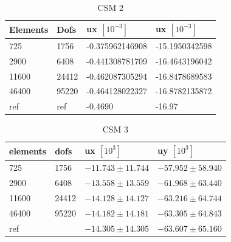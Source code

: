 \begin{table}[h!]
\centering
\caption{CSM 2}
\label{my-label}
\begin{tabular}{@{}|l|l|l|l|@{}}
\hline
Elements & Dofs & ux $[10^{-3}] $& ux $[10^{-3}] $\\ \hline
725 &  1756 & -0.375962146908 & -15.1950342598 \\ \hline
2900 & 6408 & -0.441308781709 & -16.4643196042\\ \hline
11600 & 24412 & -0.462087305294 & -16.8478689583 \\ \hline
46400 & 95220 & -0.464128022327 & -16.8782135872\\ \hline
ref & ref & -0.4690 & -16.97 \\ \hline
\end{tabular}
\end{table}

\begin{table}[h!]
\centering
\caption{CSM 3}
\label{my-label}
\begin{tabular}{|l|l|l|l|}
\hline
elements & dofs & ux $[10^3]$ & uy $[10^3]$ \\ \hline
725 & 1756 & $-11.743 \pm 11.744$ & $-57.952 \pm 58.940$ \\ \hline
2900 & 6408 & $-13.558 \pm 13.559$ & $ -61.968 \pm  63.440 $ \\ \hline
11600 & 24412 & $ -14.128 \pm 14.127$ & $-63.216 \pm 64.744 $ \\ \hline
46400 & 95220 & $ -14.182 \pm 14.181 $ & $ -63.305 \pm 64.843 $ \\ \hline
ref &  & $-14.305 \pm 14.305 $ & $-63.607 \pm 65.160 $ \\ \hline
\end{tabular}
\end{table}

